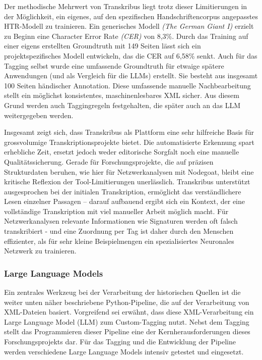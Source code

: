 \documentclass[12pt, a4paper, ngerman, bidi=default]{article}
\begin{document}
Der methodische Mehrwert von Transkribus liegt trotz dieser Limitierungen in der Möglichkeit, ein eigenes, auf den spezifischen Handschriftencorpus angepasstes HTR-Modell zu trainieren. Ein generisches Modell \textit{(The German Giant I)} erzielt zu Beginn eine Character Error Rate \textit{(CER)} von 8,3\%. Durch das Training auf einer eigens erstellten Groundtruth mit 149 Seiten lässt sich ein projektspezifisches Modell entwickeln, das die CER auf 6,58\% senkt. Auch für das Tagging selbst wurde eine umfassende Groundtruth für etwaige spätere Anwendungen (und als Vergleich für die LLMs) erstellt. Sie besteht aus insgesamt 100 Seiten händischer Annotation. Diese umfassende manuelle Nachbearbeitung stellt ein möglichst konsistentes, maschinenlesbares XML sicher. Aus diesem Grund werden auch Taggingregeln festgehalten, die später auch an das LLM weitergegeben werden.

Insgesamt zeigt sich, dass Transkribus als Plattform eine sehr hilfreiche Basis für grossvolumige Transkriptionsprojekte bietet. Die automatisierte Erkennung spart erhebliche Zeit, ersetzt jedoch weder editorische Sorgfalt noch eine manuelle Qualitätssicherung. Gerade für Forschungsprojekte, die auf präzisen Strukturdaten beruhen, wie hier für Netzwerkanalysen mit Nodegoat, bleibt eine kritische Reflexion der Tool-Limitierungen unerlässlich. Transkribus unterstützt ausgesprochen bei der initialen Transkription, ermöglicht das verständlichere Lesen einzelner Passagen -- darauf aufbauend ergibt sich ein Kontext, der eine vollständige Transkription mit viel manueller Arbeit möglich macht. Für Netzwerkanalysen relevante Informationen wie Signaturen werden oft falsch transkribiert - und eine Zuordnung per Tag ist daher durch den Menschen effizienter, als für sehr kleine Beispielmengen ein spezialisiertes Neuronales Netzwerk zu trainieren.


\subsubsection{Large Language Models}  
Ein zentrales Werkzeug bei der Verarbeitung der historischen Quellen ist die weiter unten näher beschriebene Python-Pipeline, die auf der Verarbeitung von XML-Dateien basiert. Vorgreifend sei erwähnt, dass diese XML-Verarbeitung ein Large Language Model (LLM) zum Custom-Tagging nutzt. Nebst dem Tagging stellt das Programmieren dieser Pipeline eine der Kernherausforderungen dieses Forschungsprojekts dar. 
Für das Tagging und die Entwicklung der Pipeline werden verschiedene Large Language Models intensiv getestet und eingesetzt.
\end{document}
